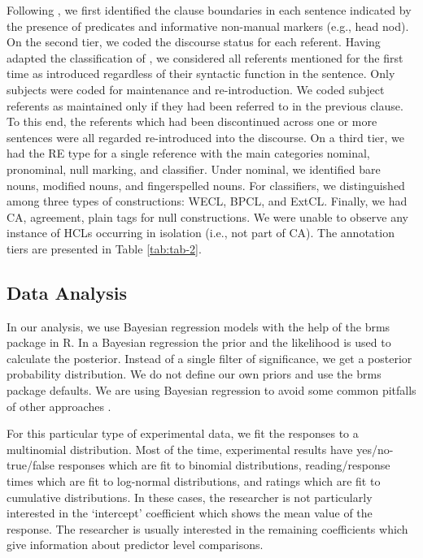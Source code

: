 \documentclass[review]{elsarticle} %
\begin{document}
Following \citet{berman2013relating}, we first identified the clause
boundaries in each sentence indicated by the presence of predicates and
informative non-manual markers (e.g., head nod). On the second tier, we
coded the discourse status for each referent. Having adapted the
classification of \citet{gullberg2006}, we considered all referents
mentioned for the first time as introduced regardless of their syntactic
function in the sentence. Only subjects were coded for maintenance and
re-introduction. We coded subject referents as maintained only if they
had been referred to in the previous clause. To this end, the referents
which had been discontinued across one or more sentences were all
regarded re-introduced into the discourse. On a third tier, we had the
RE type for a single reference with the main categories nominal,
pronominal, null marking, and classifier. Under nominal, we identified
bare nouns, modified nouns, and fingerspelled nouns. For classifiers, we
distinguished among three types of constructions: WECL, BPCL, and ExtCL.
Finally, we had CA, agreement, plain tags for null constructions. We
were unable to observe any instance of HCLs occurring in isolation
(i.e., not part of CA). The annotation tiers are presented in Table
\ref{tab:tab-2}.

\hypertarget{data-analysis}{%
\subsection{Data Analysis}\label{data-analysis}}

In our analysis, we use Bayesian regression models with the help of the
brms package \citep{burkner2018} in R. In a Bayesian regression the
prior and the likelihood is used to calculate the posterior. Instead of
a single filter of significance, we get a posterior probability
distribution. We do not define our own priors and use the brms package
defaults. We are using Bayesian regression to avoid some common pitfalls
of other approaches \citep{wagenmakers2007, kruschke2011}.

For this particular type of experimental data, we fit the responses to a
multinomial distribution. Most of the time, experimental results have
yes/no-true/false responses which are fit to binomial distributions,
reading/response times which are fit to log-normal distributions, and
ratings which are fit to cumulative distributions. In these cases, the
researcher is not particularly interested in the `intercept' coefficient
which shows the mean value of the response. The researcher is usually
interested in the remaining coefficients which give information about
predictor level comparisons.
\end{document}
